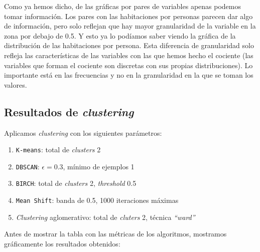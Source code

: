 \documentclass[11pt]{article}
\newcommand{\entrecomillado}[1]{\emph{``#1''}}
\begin{document}
Como ya hemos dicho, de las gráficas por pares de variables apenas podemos tomar información. Los pares con las habitaciones por personas parecen dar algo de información, pero solo reflejan que hay mayor granularidad de la variable en la zona por debajo de 0.5. Y esto ya lo podíamos saber viendo la gráfica de la distribución de las habitaciones por persona. Esta diferencia de granularidad solo refleja las características de las variables con las que hemos hecho el cociente (las variables que forman el cociente son discretas con sus propias distribuciones). Lo importante está en las frecuencias y no en la granularidad en la que se toman los valores.

\pagebreak

\subsection{Resultados de \emph{clustering}} \label{stcase01_parametros:seccion}

Aplicamos \emph{clustering} con los siguientes parámetros:

\begin{enumerate}
    \item \lstinline{K-means}: total de \emph{clusters} 2
    \item \lstinline{DBSCAN}: $\epsilon = 0.3$, mínimo de ejemplos 1
    \item \lstinline{BIRCH}: total de \emph{clusters} 2, \emph{threshold} 0.5
    \item \lstinline{Mean Shift}: banda de 0.5, 1000 iteraciones máximas
    \item \emph{Clustering} aglomerativo: total de \emph{cluters} 2, técnica \entrecomillado{ward}
\end{enumerate}

Antes de mostrar la tabla con las métricas de los algoritmos, mostramos gráficamente los resultados obtenidos:
\end{document}
